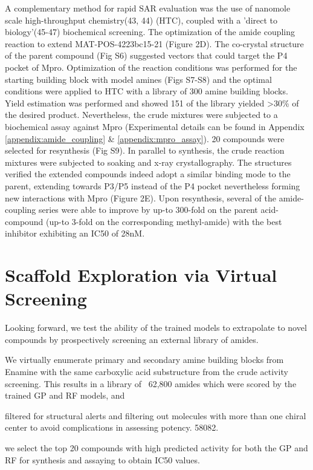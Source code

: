 A complementary method for rapid SAR evaluation was the use of nanomole scale high-throughput chemistry(43, 44) (HTC), coupled with a 'direct to biology'(45-47) biochemical screening. The optimization of the amide coupling reaction to extend MAT-POS-4223bc15-21 (Figure 2D). The co-crystal structure of the parent compound (Fig S6) suggested vectors that could target the P4 pocket of Mpro. Optimization of the reaction conditions was performed for the starting building block with model amines (Figs S7-S8) and the optimal conditions were applied to HTC with a library of 300 amine building blocks. Yield estimation was performed and showed 151 of the library yielded >30\% of the desired product. Nevertheless, the crude mixtures were subjected to a biochemical assay against Mpro (Experimental details can be found in Appendix \ref{appendix:amide_coupling} \& \ref{appendix:mpro_assay}). 20 compounds were selected for resynthesis (Fig S9). In parallel to synthesis, the crude reaction mixtures were subjected to soaking and x-ray crystallography. The structures verified the extended compounds indeed adopt a similar binding mode to the parent, extending towards P3/P5 instead of the P4 pocket nevertheless forming new interactions with Mpro (Figure 2E). Upon resynthesis, several of the amide-coupling series were able to improve by up-to 300-fold on the parent acid-compound (up-to 3-fold on the corresponding methyl-amide) with the best inhibitor exhibiting an IC50 of 28nM.



\section{Scaffold Exploration via Virtual Screening}

Looking forward, we test the ability of the trained models to extrapolate to novel compounds by prospectively screening an external library of amides. 

We virtually enumerate primary and secondary amine building blocks from Enamine with the same carboxylic acid substructure from the crude activity screening. This results in a library of ~62,800 amides which were scored by the trained GP and RF models, and 

filtered for structural alerts and filtering out molecules with more than one chiral center to avoid complications in assessing potency. 58082.

we select the top 20 compounds with high predicted activity for both the GP and RF for synthesis and assaying to obtain IC50 values. 

